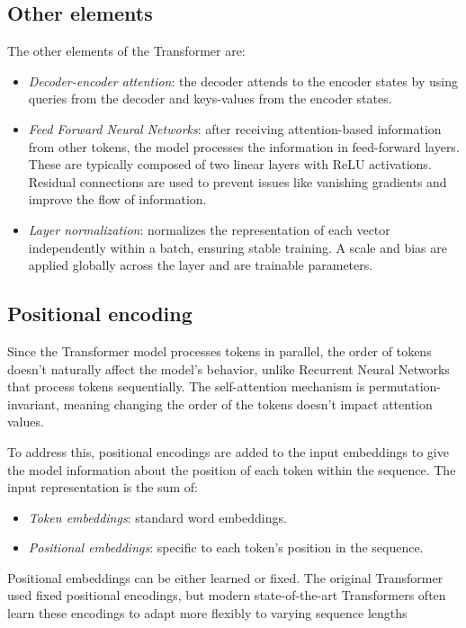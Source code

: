 \subsection{Other elements}
The other elements of the Transformer are: 
\begin{itemize}
    \item \textit{Decoder-encoder attention}: the decoder attends to the encoder states by using queries from the decoder and keys-values from the encoder states.
    \item \textit{Feed Forward Neural Networks}: after receiving attention-based information from other tokens, the model processes the information in feed-forward layers. 
        These are typically composed of two linear layers with ReLU activations.
        Residual connections are used to prevent issues like vanishing gradients and improve the flow of information.
    \item \textit{Layer normalization}: normalizes the representation of each vector independently within a batch, ensuring stable training.
        A scale and bias are applied globally across the layer and are trainable parameters.
\end{itemize}

\subsection{Positional encoding}
Since the Transformer model processes tokens in parallel, the order of tokens doesn't naturally affect the model's behavior, unlike Recurrent Neural Networks that process tokens sequentially. 
The self-attention mechanism is permutation-invariant, meaning changing the order of the tokens doesn't impact attention values.

To address this, positional encodings are added to the input embeddings to give the model information about the position of each token within the sequence. 
The input representation is the sum of:
\begin{itemize}
    \item \textit{Token embeddings}: standard word embeddings.
    \item \textit{Positional embeddings}: specific to each token's position in the sequence. 
\end{itemize}
Positional embeddings can be either learned or fixed. 
The original Transformer used fixed positional encodings, but modern state-of-the-art Transformers often learn these encodings to adapt more flexibly to varying sequence lengths